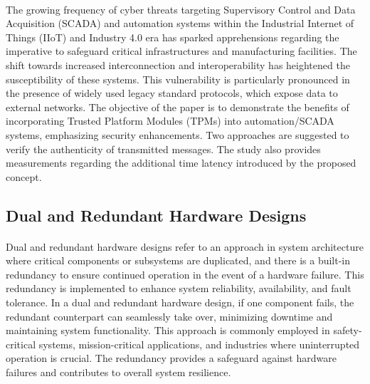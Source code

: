 \paragraph*{}
The growing frequency of cyber threats targeting Supervisory Control and Data Acquisition (SCADA) and automation systems within the Industrial Internet of Things (IIoT) and Industry 4.0 era has sparked apprehensions regarding the imperative to safeguard critical infrastructures and manufacturing facilities. The shift towards increased interconnection and interoperability has heightened the susceptibility of these systems. This vulnerability is particularly pronounced in the presence of widely used legacy standard protocols, which expose data to external networks. The objective of the paper \cite{s19194191} is to demonstrate the benefits of incorporating Trusted Platform Modules (TPMs) into automation/SCADA systems, emphasizing security enhancements. Two approaches are suggested to verify the authenticity of transmitted messages. The study also provides measurements regarding the additional time latency introduced by the proposed concept.
\subsection{Dual and Redundant Hardware Designs}
\paragraph*{}
Dual and redundant hardware designs refer to an approach in system architecture where critical components or subsystems are duplicated, and there is a built-in redundancy to ensure continued operation in the event of a hardware failure. This redundancy is implemented to enhance system reliability, availability, and fault tolerance. In a dual and redundant hardware design, if one component fails, the redundant counterpart can seamlessly take over, minimizing downtime and maintaining system functionality. This approach is commonly employed in safety-critical systems, mission-critical applications, and industries where uninterrupted operation is crucial. The redundancy provides a safeguard against hardware failures and contributes to overall system resilience.

